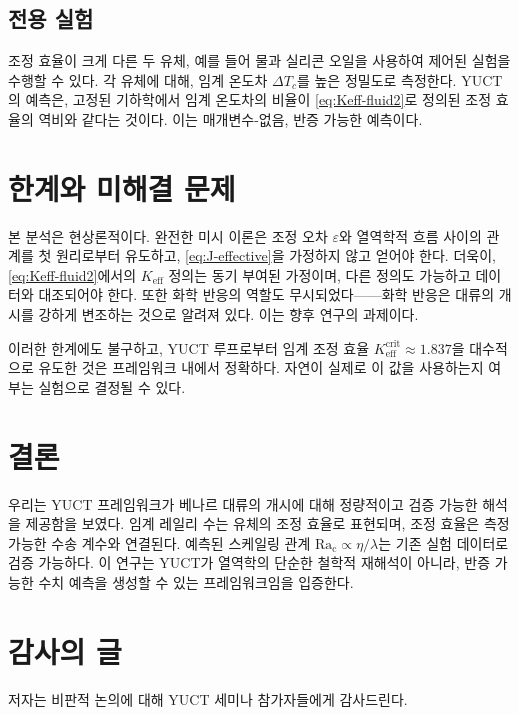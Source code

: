 \documentclass[12pt,a4paper]{article}
\begin{document}
	\subsection{전용 실험}
	조정 효율이 크게 다른 두 유체, 예를 들어 물과 실리콘 오일을 사용하여 제어된 실험을 수행할 수 있다. 각 유체에 대해, 임계 온도차 \(\Delta T_c\)를 높은 정밀도로 측정한다. YUCT의 예측은, 고정된 기하학에서 임계 온도차의 비율이 \eqref{eq:Keff-fluid2}로 정의된 조정 효율의 역비와 같다는 것이다. 이는 매개변수-없음, 반증 가능한 예측이다.
	
	\section{한계와 미해결 문제}
	
	본 분석은 현상론적이다. 완전한 미시 이론은 조정 오차 \(\varepsilon\)와 열역학적 흐름 사이의 관계를 첫 원리로부터 유도하고, \eqref{eq:J-effective}을 가정하지 않고 얻어야 한다. 더욱이, \eqref{eq:Keff-fluid2}에서의 \(K_{\mathrm{eff}}\) 정의는 동기 부여된 가정이며, 다른 정의도 가능하고 데이터와 대조되어야 한다. 또한 화학 반응의 역할도 무시되었다——화학 반응은 대류의 개시를 강하게 변조하는 것으로 알려져 있다. 이는 향후 연구의 과제이다.
	
	이러한 한계에도 불구하고, YUCT 루프로부터 임계 조정 효율 \(K_{\mathrm{eff}}^{\mathrm{crit}} \approx 1.837\)을 대수적으로 유도한 것은 프레임워크 내에서 정확하다. 자연이 실제로 이 값을 사용하는지 여부는 실험으로 결정될 수 있다.
	
	\section{결론}
	
	우리는 YUCT 프레임워크가 베나르 대류의 개시에 대해 정량적이고 검증 가능한 해석을 제공함을 보였다. 임계 레일리 수는 유체의 조정 효율로 표현되며, 조정 효율은 측정 가능한 수송 계수와 연결된다. 예측된 스케일링 관계 \(\mathrm{Ra_c} \propto \eta/\lambda\)는 기존 실험 데이터로 검증 가능하다. 이 연구는 YUCT가 열역학의 단순한 철학적 재해석이 아니라, 반증 가능한 수치 예측을 생성할 수 있는 프레임워크임을 입증한다.
	
	\section*{감사의 글}
	저자는 비판적 논의에 대해 YUCT 세미나 참가자들에게 감사드린다.
	
\end{document}
